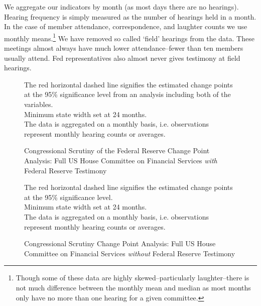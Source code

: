 \documentclass[a4paper]{article}\usepackage[]{graphicx}\usepackage[]{color}
\makeatletter
\newenvironment{kframe}{%
 \def\at@end@of@kframe{}%
 \ifinner\ifhmode%
  \def\at@end@of@kframe{\end{minipage}}%
  \begin{minipage}{\columnwidth}%
 \fi\fi%
 \def\FrameCommand##1{\hskip\@totalleftmargin \hskip-\fboxsep
 \colorbox{shadecolor}{##1}\hskip-\fboxsep
     \hskip-\linewidth \hskip-\@totalleftmargin \hskip\columnwidth}%
 \MakeFramed {\advance\hsize-\width
   \@totalleftmargin\z@ \linewidth\hsize
   \@setminipage}}%
 {\par\unskip\endMakeFramed%
 \at@end@of@kframe}
\newenvironment{knitrout}{}{} %
\makeatother
\begin{document}
We aggregate our indicators by month (as most days there are no hearings). Hearing frequency is simply measured as the number of hearings held in a month. In the case of member attendance, correspondence, and laughter counts we use monthly means.\footnote{Though some of these data are highly skewed--particularly laughter--there is not much difference between the monthly mean and median as most months only have no more than one hearing for a given committee.} We have removed so called `field' hearings from the data. These meetings almost always have much lower attendance--fewer than ten members usually attend. Fed representatives also almost never gives testimony at field hearings.

\begin{figure}
    \caption{Congressional Scrutiny of the Federal Reserve Change Point Analysis: Full US House Committee on Financial Services \emph{with} Federal Reserve Testimony}
    \label{fig:HouseFedCP}
\begin{knitrout}
\color{fgcolor}\begin{kframe}


{\ttfamily\noindent\bfseries\color{errorcolor}{\#\# Error: unused arguments (eps = eps, half = half)}}\end{kframe}
\end{knitrout}
{\scriptsize{The red horizontal dashed line signifies the estimated change points at the 95\% significance level from an analysis including both of the variables.\\
Minimum state width set at 24 months. \\
The data is aggregated on a monthly basis, i.e. observations represent monthly hearing counts or averages.}}
\end{figure}


\begin{figure}
    \caption{Congressional Scrutiny Change Point Analysis: Full US House Committee on Financial Services \emph{without} Federal Reserve Testimony}
    \label{fig:BaseNonFedCP}
\begin{knitrout}
\color{fgcolor}\begin{kframe}


{\ttfamily\noindent\bfseries\color{errorcolor}{\#\# Error: unused arguments (eps = eps, half = half)}}\end{kframe}
\end{knitrout}
{\scriptsize{The red horizontal dashed line signifies the estimated change points at the 95\% significance level.\\
Minimum state width set at 24 months. \\
The data is aggregated on a monthly basis, i.e. observations represent monthly hearing counts or averages.}}
\end{figure}
\end{document}
